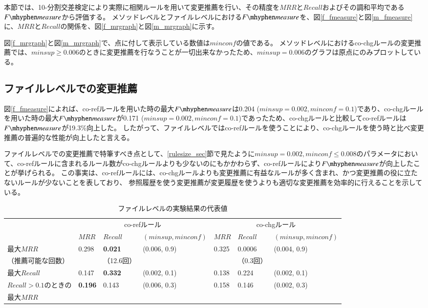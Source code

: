 \documentclass[a4paper]{jsbook}
\newcommand{\minconf}{mincon\!f}
\newcommand{\fmeasure}{F\mhyphen measure}
\begin{document}
本節では、10-分割交差検定により実際に相関ルールを用いて変更推薦を行い、その精度を$MRR$と$Recall$およびその調和平均である$\fmeasure$から評価する。
メソッドレベルとファイルレベルにおける$\fmeasure$を、図\ref{f_fmeasure}と図\ref{m_fmeasure}に、$MRR$と$Recall$の関係を、図\ref{f_mrgraph}と図\ref{m_mrgraph}に示す。

図\ref{f_mrgraph}と図\ref{m_mrgraph}で、点に付して表示している数値は$\minconf$の値である。
メソッドレベルにおけるco-chgルールの変更推薦では、$minsup \geq 0.006$のときに変更推薦を行なうことが一切出来なかったため、$minsup = 0.006$のグラフは原点にのみプロットしている。


\subsection{ファイルレベルでの変更推薦}\label{file_result_sec}
図\ref{f_fmeasure}によれば、co-refルールを用いた時の最大$\fmeasure$は0.204 ($minsup=0.002, \minconf =0.1$)であり、co-chgルールを用いた時の最大$\fmeasure$が0.171 ($minsup=0.002, \minconf =0.1$)であったため、co-chgルールと比較してco-refルールは$\fmeasure$が19.3\%向上した。
したがって、ファイルレベルではco-refルールを使うことにより、co-chgルールを使う時と比べ変更推薦の普遍的な性能が向上したと言える。

ファイルレベルでの変更推薦で特筆すべき点として、\ref{rulesize_sec}節で見たように$minsup=0.002,\minconf \leq 0.008$のパラメータにおいて、co-refルールに含まれるルール数がco-chgルールよりも少ないのにもかかわらず、co-refルールにより$\fmeasure$が向上したことが挙げられる。
この事実は、co-refルールには、co-chgルールよりも変更推薦に有益なルールが多く含まれ、かつ変更推薦の役に立たないルールが少ないことを表しており、
参照履歴を使う変更推薦が変更履歴を使うよりも適切な変更推薦を効率的に行えることを示している。

\begin{table}[t]
  \begin{center}
    \caption{ファイルレベルの実験結果の代表値}
    \label{results_file_table}
    \begin{tabular}{l|lll|lll}
      \hline
       & \multicolumn{3}{|c|}{co-refルール} & \multicolumn{3}{|c}{co-chgルール}\\
       &$MRR$ & $Recall$ & $(minsup,\minconf)$ & $MRR$ & $Recall$ & $(minsup,\minconf)$ \\
      \hline
      最大$MRR$ &0.298&{\bf 0.021} & (0.006, 0.9) &0.325&0.0006 & (0.004, 0.9)\\
      （推薦可能な回数）            &&（12.6回） &&& （0.3回）\\
      \hline
      最大$Recall$    &0.147&{\bf 0.332} & (0.002, 0.1) &0.138&0.224 & (0.002, 0.1) \\
      \hline
      $Recall > 0.1$のときの &{\bf 0.196}& 0.143 & (0.006, 0.3) &0.158&0.146 & (0.002, 0.3) \\
      最大$MRR$&&&&&\\
      \hline
    \end{tabular}
  \end{center}
\end{table}
\end{document}
